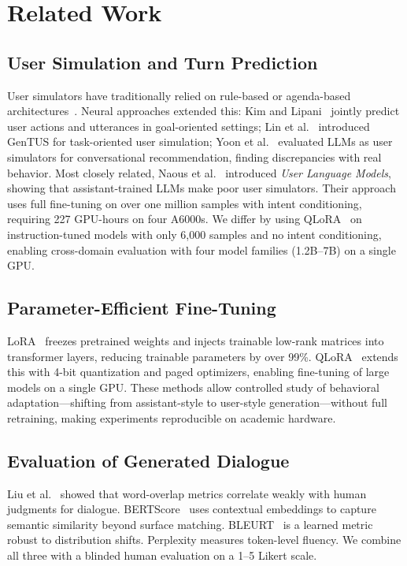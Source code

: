 \documentclass[conference]{IEEEtran}
\begin{document}
\section{Related Work}

\subsection{User Simulation and Turn Prediction}

User simulators have traditionally relied on rule-based or agenda-based architectures~\cite{shi2019simulators}. Neural approaches extended this: Kim and Lipani~\cite{kim2022multitask} jointly predict user actions and utterances in goal-oriented settings; Lin et al.~\cite{lin2022gentus} introduced GenTUS for task-oriented user simulation; Yoon et al.~\cite{yoon2024evaluating} evaluated LLMs as user simulators for conversational recommendation, finding discrepancies with real behavior. Most closely related, Naous et al.~\cite{naous2025flipping} introduced \emph{User Language Models}, showing that assistant-trained LLMs make poor user simulators. Their approach uses full fine-tuning on over one million samples with intent conditioning, requiring 227 GPU-hours on four A6000s. We differ by using QLoRA~\cite{dettmers2023qlora} on instruction-tuned models with only 6{,}000 samples and no intent conditioning, enabling cross-domain evaluation with four model families (1.2B--7B) on a single GPU.

\subsection{Parameter-Efficient Fine-Tuning}

LoRA~\cite{hu2021lora} freezes pretrained weights and injects trainable low-rank matrices into transformer layers, reducing trainable parameters by over 99\%. QLoRA~\cite{dettmers2023qlora} extends this with 4-bit quantization and paged optimizers, enabling fine-tuning of large models on a single GPU. These methods allow controlled study of behavioral adaptation---shifting from assistant-style to user-style generation---without full retraining, making experiments reproducible on academic hardware.

\subsection{Evaluation of Generated Dialogue}

Liu et al.~\cite{liu2017hownoteval} showed that word-overlap metrics correlate weakly with human judgments for dialogue. BERTScore~\cite{zhang2020bertscore} uses contextual embeddings to capture semantic similarity beyond surface matching. BLEURT~\cite{sellam2020bleurt} is a learned metric robust to distribution shifts. Perplexity measures token-level fluency. We combine all three with a blinded human evaluation on a 1--5 Likert scale.
\end{document}
